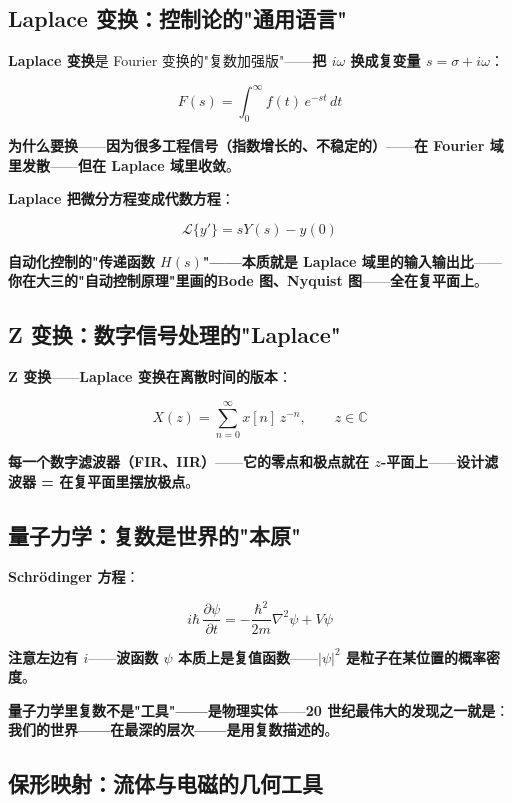 \subsection{Laplace 变换：控制论的"通用语言"}

\textbf{Laplace 变换}是 Fourier 变换的"复数加强版"——\textbf{把 $i\omega$ 换成复变量 $s = \sigma + i\omega$}：

\[
F(s) = \int_0^\infty f(t)\, e^{-st}\, dt
\]

\textbf{为什么要换}——\textbf{因为很多工程信号（指数增长的、不稳定的）}——\textbf{在 Fourier 域里发散}——\textbf{但在 Laplace 域里收敛}。

\textbf{Laplace 把\textbf{微分方程}变成\textbf{代数方程}}：

\[
\mathcal{L}\{y'\} = sY(s) - y(0)
\]

\textbf{自动化控制的"传递函数 $H(s)$"——本质就是 Laplace 域里的输入输出比}——\textbf{你在大三的"自动控制原理"里画的\textbf{Bode 图、Nyquist 图}}——\textbf{全在复平面上}。

\subsection{Z 变换：数字信号处理的"Laplace"}

\textbf{Z 变换}——\textbf{Laplace 变换在\textbf{离散时间}的版本}：

\[
X(z) = \sum_{n=0}^{\infty} x[n]\, z^{-n}, \qquad z \in \mathbb{C}
\]

\textbf{每一个数字滤波器（FIR、IIR）}——\textbf{它的\textbf{零点和极点}就在 $z$-平面上}——\textbf{设计滤波器 = 在复平面里摆放极点}。

\subsection{量子力学：复数是世界的"本原"}

\textbf{Schr\"odinger 方程}：

\[
i\hbar\, \frac{\partial \psi}{\partial t} = -\frac{\hbar^2}{2m}\nabla^2 \psi + V \psi
\]

\textbf{注意左边有 $i$}——\textbf{波函数 $\psi$ \textbf{本质上是复值函数}}——\textbf{$|\psi|^2$ 是粒子在某位置的概率密度}。

\textbf{量子力学里复数不是"工具"——是\textbf{物理实体}}——\textbf{20 世纪最伟大的发现之一就是}：\textbf{我们的世界——在最深的层次——是用复数描述的}。

\subsection{保形映射：流体与电磁的几何工具}

